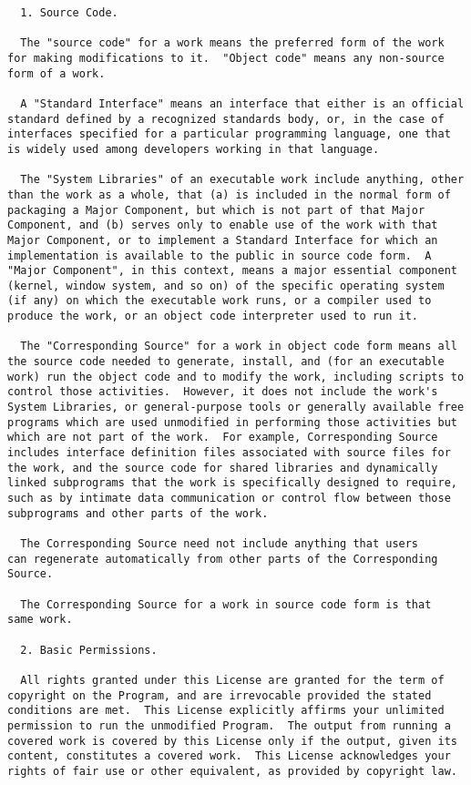 \documentclass[11pt]{article}
\begin{document}
\begin{verbatim}
  1. Source Code.

  The "source code" for a work means the preferred form of the work
for making modifications to it.  "Object code" means any non-source
form of a work.

  A "Standard Interface" means an interface that either is an official
standard defined by a recognized standards body, or, in the case of
interfaces specified for a particular programming language, one that
is widely used among developers working in that language.

  The "System Libraries" of an executable work include anything, other
than the work as a whole, that (a) is included in the normal form of
packaging a Major Component, but which is not part of that Major
Component, and (b) serves only to enable use of the work with that
Major Component, or to implement a Standard Interface for which an
implementation is available to the public in source code form.  A
"Major Component", in this context, means a major essential component
(kernel, window system, and so on) of the specific operating system
(if any) on which the executable work runs, or a compiler used to
produce the work, or an object code interpreter used to run it.

  The "Corresponding Source" for a work in object code form means all
the source code needed to generate, install, and (for an executable
work) run the object code and to modify the work, including scripts to
control those activities.  However, it does not include the work's
System Libraries, or general-purpose tools or generally available free
programs which are used unmodified in performing those activities but
which are not part of the work.  For example, Corresponding Source
includes interface definition files associated with source files for
the work, and the source code for shared libraries and dynamically
linked subprograms that the work is specifically designed to require,
such as by intimate data communication or control flow between those
subprograms and other parts of the work.

  The Corresponding Source need not include anything that users
can regenerate automatically from other parts of the Corresponding
Source.

  The Corresponding Source for a work in source code form is that
same work.

  2. Basic Permissions.

  All rights granted under this License are granted for the term of
copyright on the Program, and are irrevocable provided the stated
conditions are met.  This License explicitly affirms your unlimited
permission to run the unmodified Program.  The output from running a
covered work is covered by this License only if the output, given its
content, constitutes a covered work.  This License acknowledges your
rights of fair use or other equivalent, as provided by copyright law.


\end{verbatim}
\end{document}

